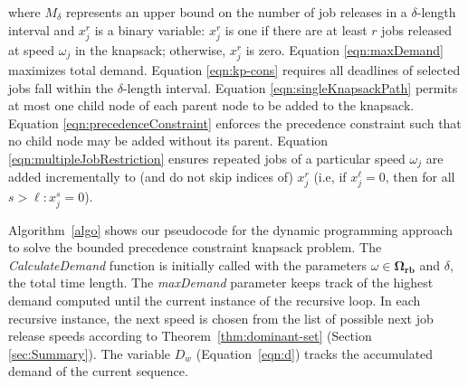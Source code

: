 \noindent where $M_\delta$ represents an upper bound on the number of job releases in a $\delta$-length interval and  $x_j^r$ is a binary variable: $x_j^r$ is one if there are at least $r$ jobs released at speed $\omega_j$ in the knapsack; otherwise, $x_j^r$ is zero.
Equation \ref{eqn:maxDemand}  maximizes total demand.
Equation \ref{eqn:kp-cons} requires all deadlines of selected jobs fall within the $\delta$-length interval.
Equation \ref{eqn:singleKnapsackPath} permits at most one child node of each parent node to be added to the knapsack.
Equation \ref{eqn:precedenceConstraint} enforces the precedence constraint such that no child node may be added without its parent.
Equation \ref{eqn:multipleJobRestriction} ensures repeated jobs of a particular speed $\omega_j$ are added incrementally to (and do not skip indices of) $x_j^r$ (i.e, if $x_j^\ell = 0$, then for all $s > \ell: x_j^s = 0$). 


Algorithm~\ref{algo} shows our pseudocode for the dynamic programming approach to solve the bounded precedence constraint knapsack problem.
The \emph{CalculateDemand} function is initially called with the parameters $\omega \in \mathbf{\Omega_{rb}}$ and $\delta$, the total time length.
The \emph{maxDemand} parameter keeps track of the highest demand computed until the current instance of the recursive loop.
In each recursive instance, the next speed is chosen from the list of %
possible next job release speeds according to Theorem~\ref{thm:dominant-set} (Section \ref{sec:Summary}).
The variable $D_w$ (Equation~\ref{eqn:d}) tracks the accumulated demand of the current sequence.


